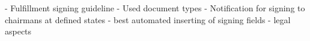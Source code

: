 - Fulfillment signing guideline
- Used document types
- Notification for signing to chairmans at defined states
- best automated inserting of signing fields
- legal aspects